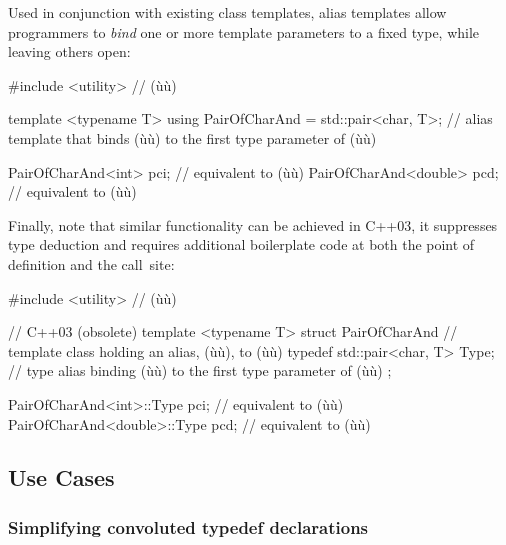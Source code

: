 \noindent Used in conjunction with existing class templates, alias templates allow
programmers to \emph{bind} one or more template parameters to a fixed
type, while leaving others open:

\begin{emcppslisting}
#include <utility>  // (ù{}ù)

template <typename T>
using PairOfCharAnd = std::pair<char, T>;
    // alias template that binds (ù{}ù) to the first type parameter of (ù{}ù)

PairOfCharAnd<int>    pci;  // equivalent to (ù{}ù)
PairOfCharAnd<double> pcd;  // equivalent to (ù{}ù)
\end{emcppslisting}

\noindent Finally, note that similar functionality can be
achieved in C++03, it suppresses type deduction and requires additional boilerplate code at both the
point of definition and the call~site:

\begin{emcppshiddenlisting}[emcppsbatch=e1]
#include <utility>  // (ù{}ù)
\end{emcppshiddenlisting}
\begin{emcppslisting}[emcppsbatch=e1]
// C++03 (obsolete)
template <typename T>
struct PairOfCharAnd
    // template class holding an alias, (ù{}ù), to (ù{}ù)
{
    typedef std::pair<char, T> Type;
        // type alias binding (ù{}ù) to the first type parameter of (ù{}ù)
};

PairOfCharAnd<int>::Type    pci;  // equivalent to (ù{}ù)
PairOfCharAnd<double>::Type pcd;  // equivalent to (ù{}ù)
\end{emcppslisting}


\subsection[Use Cases]{Use Cases}\label{use-cases}

\subsubsection[Simplifying convoluted \lstinline!typedef! declarations]{Simplifying convoluted {\SubsubsecCode typedef} declarations}\label{simplifying-convoluted-typedef-declarations}

